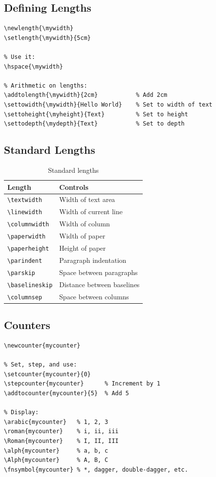 \subsection{Defining Lengths}

\begin{Verbatim}[frame=single, fontsize=\small, label=Custom lengths]
% Create a new length:
\newlength{\mywidth}
\setlength{\mywidth}{5cm}

% Use it:
\hspace{\mywidth}

% Arithmetic on lengths:
\addtolength{\mywidth}{2cm}           % Add 2cm
\settowidth{\mywidth}{Hello World}    % Set to width of text
\settoheight{\myheight}{Text}         % Set to height
\settodepth{\mydepth}{Text}           % Set to depth
\end{Verbatim}

\subsection{Standard Lengths}

\begin{table}[H]
\centering
\begin{tabular}{ll}
\toprule
\textbf{Length} & \textbf{Controls} \\
\midrule
\verb|\textwidth|      & Width of text area \\
\verb|\linewidth|      & Width of current line \\
\verb|\columnwidth|    & Width of column \\
\verb|\paperwidth|     & Width of paper \\
\verb|\paperheight|    & Height of paper \\
\verb|\parindent|      & Paragraph indentation \\
\verb|\parskip|        & Space between paragraphs \\
\verb|\baselineskip|   & Distance between baselines \\
\verb|\columnsep|      & Space between columns \\
\bottomrule
\end{tabular}
\caption{Standard \latex{} lengths}
\end{table}

\subsection{Counters}

\begin{lstlisting}[language={[LaTeX]TeX}, caption=Counters]
% Define a new counter:
\newcounter{mycounter}

% Set, step, and use:
\setcounter{mycounter}{0}
\stepcounter{mycounter}      % Increment by 1
\addtocounter{mycounter}{5}  % Add 5

% Display:
\arabic{mycounter}   % 1, 2, 3
\roman{mycounter}    % i, ii, iii
\Roman{mycounter}    % I, II, III
\alph{mycounter}     % a, b, c
\Alph{mycounter}     % A, B, C
\fnsymbol{mycounter} % *, dagger, double-dagger, etc.
\end{lstlisting}

